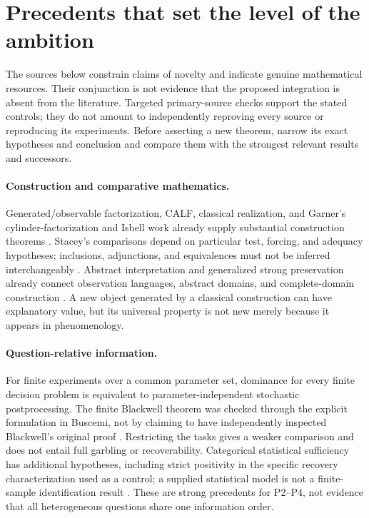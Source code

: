 \documentclass[11pt]{article}
\theoremstyle{definition}
\begin{document}
\section{Precedents that set the level of the ambition}
\label{app:precedents}

The sources below constrain claims of novelty and indicate genuine mathematical resources. Their conjunction is not evidence that the proposed integration is absent from the literature. Targeted primary-source checks support the stated controls; they do not amount to independently reproving every source or reproducing its experiments. Before asserting a new theorem, narrow its exact hypotheses and conclusion and compare them with the strongest relevant results and successors.

\paragraph{Construction and comparative mathematics.}
Generated/observable factorization, CALF, classical realization, and Garner's cylinder-factorization and Isbell work already supply substantial construction theorems \cite{CALF,Garner}. Stacey's comparisons depend on particular test, forcing, and adequacy hypotheses; inclusions, adjunctions, and equivalences must not be inferred interchangeably \cite{Stacey}. Abstract interpretation and generalized strong preservation already connect observation languages, abstract domains, and complete-domain construction \cite{StrongPreservation}. A new object generated by a classical construction can have explanatory value, but its universal property is not new merely because it appears in phenomenology.

\paragraph{Question-relative information.}
For finite experiments over a common parameter set, dominance for every finite decision problem is equivalent to parameter-independent stochastic postprocessing. The finite Blackwell theorem was checked through the explicit formulation in Buscemi, not by claiming to have independently inspected Blackwell's original proof \cite{Blackwell,Buscemi}. Restricting the tasks gives a weaker comparison and does not entail full garbling or recoverability. Categorical statistical sufficiency has additional hypotheses, including strict positivity in the specific recovery characterization used as a control; a supplied statistical model is not a finite-sample identification result \cite{Fritz}. These are strong precedents for P2--P4, not evidence that all heterogeneous questions share one information order.
\end{document}
